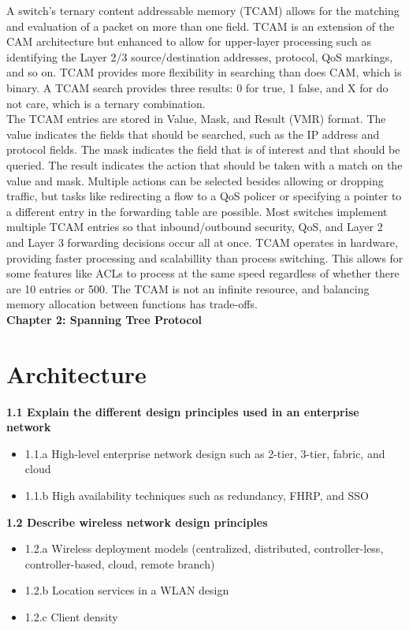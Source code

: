 \documentclass{article}
\begin{document}
	A switch's ternary content addressable memory (TCAM) allows for the matching and evaluation of a packet on more than one field. TCAM is an extension of the CAM architecture but enhanced to allow for upper-layer processing such as identifying the Layer 2/3 source/destination addresses, protocol, QoS markings, and so on. TCAM provides more flexibility in searching than does CAM, which is binary. A TCAM search provides three results: 0 for true, 1 false, and X for do not care, which is a ternary combination.\\

The TCAM entries are stored in Value, Mask, and Result (VMR) format. The value indicates the fields that should be searched, such as the IP address and protocol fields. The mask indicates the field that is of interest and that should be queried. The result indicates the action that should be taken with a match on the value and mask. Multiple actions can be selected besides allowing or dropping traffic, but tasks like redirecting a flow to a QoS policer or specifying a pointer to a different entry in the forwarding table are possible. Most switches implement multiple TCAM entries so that inbound/outbound security, QoS, and Layer 2 and Layer 3 forwarding decisions occur all at once. TCAM operates in hardware, providing faster processing and scalabillity than process switching. This allows for some features like ACLs to process at the same speed regardless of whether there are 10 entries or 500. The TCAM is not an infinite resource, and balancing memory allocation between functions has trade-offs.\\



\noindent\textbf{Chapter 2: Spanning Tree Protocol}\\


\section{Architecture}
\textbf{1.1 Explain the different design principles used in an enterprise network}
\begin{itemize}
\item 1.1.a High-level enterprise network design such as 2-tier, 3-tier, fabric, and cloud
\item 1.1.b High availability techniques such as redundancy, FHRP, and SSO
\end{itemize}

\noindent\textbf{1.2 Describe wireless network design principles}
\begin{itemize}
\item 1.2.a Wireless deployment models (centralized, distributed, controller-less, controller-based, cloud, remote branch)
\item 1.2.b Location services in a WLAN design
\item 1.2.c Client density
\end{itemize}
\end{document}
